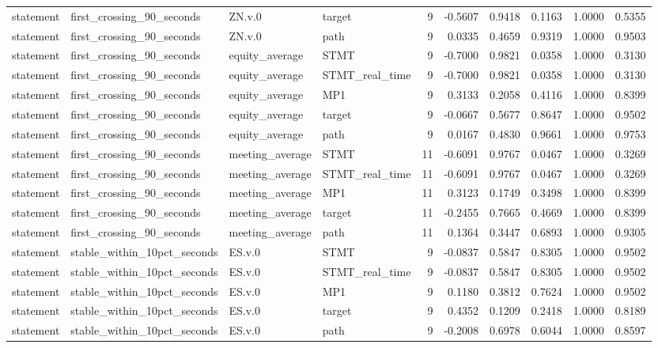 \begin{tabular}{llllrrrrrr}
statement & first_crossing_90_seconds & ZN.v.0 & target & 9 & -0.5607 & 0.9418 & 0.1163 & 1.0000 & 0.5355 \\
statement & first_crossing_90_seconds & ZN.v.0 & path & 9 & 0.0335 & 0.4659 & 0.9319 & 1.0000 & 0.9503 \\
statement & first_crossing_90_seconds & equity_average & STMT & 9 & -0.7000 & 0.9821 & 0.0358 & 1.0000 & 0.3130 \\
statement & first_crossing_90_seconds & equity_average & STMT_real_time & 9 & -0.7000 & 0.9821 & 0.0358 & 1.0000 & 0.3130 \\
statement & first_crossing_90_seconds & equity_average & MP1 & 9 & 0.3133 & 0.2058 & 0.4116 & 1.0000 & 0.8399 \\
statement & first_crossing_90_seconds & equity_average & target & 9 & -0.0667 & 0.5677 & 0.8647 & 1.0000 & 0.9502 \\
statement & first_crossing_90_seconds & equity_average & path & 9 & 0.0167 & 0.4830 & 0.9661 & 1.0000 & 0.9753 \\
statement & first_crossing_90_seconds & meeting_average & STMT & 11 & -0.6091 & 0.9767 & 0.0467 & 1.0000 & 0.3269 \\
statement & first_crossing_90_seconds & meeting_average & STMT_real_time & 11 & -0.6091 & 0.9767 & 0.0467 & 1.0000 & 0.3269 \\
statement & first_crossing_90_seconds & meeting_average & MP1 & 11 & 0.3123 & 0.1749 & 0.3498 & 1.0000 & 0.8399 \\
statement & first_crossing_90_seconds & meeting_average & target & 11 & -0.2455 & 0.7665 & 0.4669 & 1.0000 & 0.8399 \\
statement & first_crossing_90_seconds & meeting_average & path & 11 & 0.1364 & 0.3447 & 0.6893 & 1.0000 & 0.9305 \\
statement & stable_within_10pct_seconds & ES.v.0 & STMT & 9 & -0.0837 & 0.5847 & 0.8305 & 1.0000 & 0.9502 \\
statement & stable_within_10pct_seconds & ES.v.0 & STMT_real_time & 9 & -0.0837 & 0.5847 & 0.8305 & 1.0000 & 0.9502 \\
statement & stable_within_10pct_seconds & ES.v.0 & MP1 & 9 & 0.1180 & 0.3812 & 0.7624 & 1.0000 & 0.9502 \\
statement & stable_within_10pct_seconds & ES.v.0 & target & 9 & 0.4352 & 0.1209 & 0.2418 & 1.0000 & 0.8189 \\
statement & stable_within_10pct_seconds & ES.v.0 & path & 9 & -0.2008 & 0.6978 & 0.6044 & 1.0000 & 0.8597 \\

\end{tabular}
